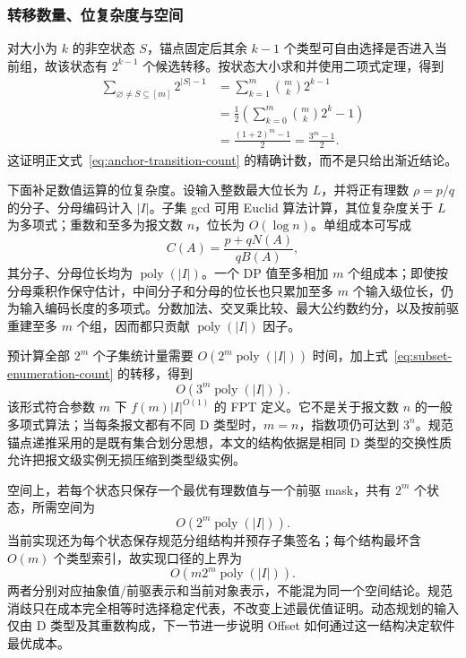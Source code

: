 \documentclass[UTF8,a4paper,twoside,zihao=-4]{ctexart}
\numberwithin{equation}{section}
\numberwithin{figure}{section}
\numberwithin{table}{section}
\theoremstyle{definition}
\numberwithin{algocf}{section}
\begin{document}
\subsubsection{转移数量、位复杂度与空间}
\label{subsubsec:appendix-dp-complexity-derivation}

对大小为 $k$ 的非空状态 $S$，锚点固定后其余 $k-1$ 个类型可自由选择是否进入当前组，故该状态有 $2^{k-1}$ 个候选转移。按状态大小求和并使用二项式定理，得到
\begin{equation}
 \begin{aligned}
 \sum_{\varnothing\ne S\subseteq[m]}2^{|S|-1}
 &=\sum_{k=1}^{m}\binom{m}{k}2^{k-1}\\
 &=\frac{1}{2}\left(\sum_{k=0}^{m}\binom{m}{k}2^k-1\right)\\
 &=\frac{(1+2)^m-1}{2}
 =\frac{3^m-1}{2}.
 \end{aligned}
\label{eq:subset-enumeration-count}
\end{equation}
这证明正文式~\eqref{eq:anchor-transition-count} 的精确计数，而不是只给出渐近结论。

下面补足数值运算的位复杂度。设输入整数最大位长为 $L$，并将正有理数 $\rho=p/q$ 的分子、分母编码计入 $|I|$。子集 gcd 可用 Euclid 算法计算，其位复杂度关于 $L$ 为多项式；重数和至多为报文数 $n$，位长为 $O(\log n)$。单组成本可写成
\begin{equation}
 C(A)=\frac{p+qN(A)}{qB(A)},
\label{eq:appendix-rational-group-cost}
\end{equation}
其分子、分母位长均为 $\operatorname{poly}(|I|)$。一个 DP 值至多相加 $m$ 个组成本；即使按分母乘积作保守估计，中间分子和分母的位长也只累加至多 $m$ 个输入级位长，仍为输入编码长度的多项式。分数加法、交叉乘比较、最大公约数约分，以及按前驱重建至多 $m$ 个组，因而都只贡献 $\operatorname{poly}(|I|)$ 因子。

预计算全部 $2^m$ 个子集统计量需要 $O(2^m\operatorname{poly}(|I|))$ 时间，加上式~\eqref{eq:subset-enumeration-count} 的转移，得到
\begin{equation}
 O\!\left(3^m\operatorname{poly}(|I|)\right).
\end{equation}
该形式符合参数 $m$ 下 $f(m)|I|^{O(1)}$ 的 FPT 定义\cite{downey2013,mnich2015}。它不是关于报文数 $n$ 的一般多项式算法；当每条报文都有不同 D 类型时，$m=n$，指数项仍可达到 $3^n$。规范锚点递推采用的是既有集合划分思想\cite{bjorklund2009}，本文的结构依据是相同 D 类型的交换性质允许把报文级实例无损压缩到类型级实例。

空间上，若每个状态只保存一个最优有理数值与一个前驱 mask，共有 $2^m$ 个状态，所需空间为
\begin{equation}
 O\!\left(2^m\operatorname{poly}(|I|)\right).
\end{equation}
当前实现还为每个状态保存规范分组结构并预存子集签名；每个结构最坏含 $O(m)$ 个类型索引，故实现口径的上界为
\begin{equation}
 O\!\left(m2^m\operatorname{poly}(|I|)\right).
\end{equation}
两者分别对应抽象值/前驱表示和当前对象表示，不能混为同一个空间结论。规范消歧只在成本完全相等时选择稳定代表，不改变上述最优值证明。动态规划的输入仅由 D 类型及其重数构成，下一节进一步说明 Offset 如何通过这一结构决定软件最优成本。
\end{document}
